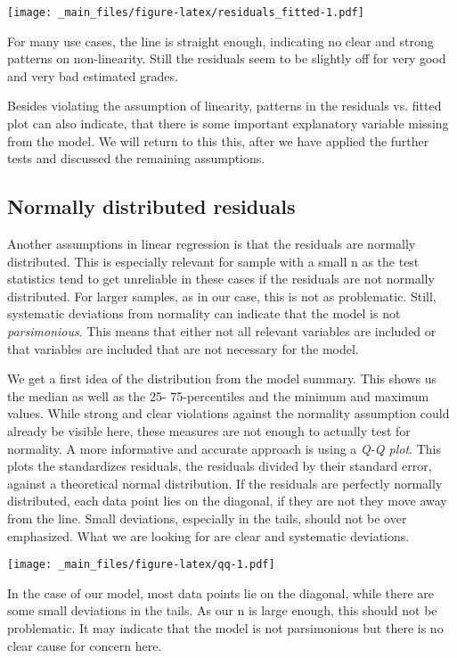 \documentclass[
]{book}
\begin{document}
\texttt{[image: \_main\_files/figure-latex/residuals\_fitted-1.pdf]}

For many use cases, the line is straight enough, indicating no clear and strong
patterns on non-linearity. Still the residuals seem to be slightly off for very
good and very bad estimated grades.

Besides violating the assumption of linearity, patterns in the residuals vs.
fitted plot can also indicate, that there is some important explanatory variable
missing from the model.
We will return to this this, after we have applied the further tests and
discussed the remaining assumptions.

\hypertarget{normally-distributed-residuals}{%
\subsection{Normally distributed residuals}\label{normally-distributed-residuals}}

Another assumptions in linear regression is that the residuals are normally
distributed. This is especially relevant for sample with a small n as the
test statistics tend to get unreliable in these cases if the residuals are not
normally distributed. For larger samples, as in our case, this is not as
problematic. Still, systematic deviations from normality can indicate that the
model is not \emph{parsimonious}. This means that either not all relevant variables
are included or that variables are included that are not necessary for the model.

We get a first idea of the distribution from the model summary. This shows us
the median as well as the 25- 75-percentiles and the minimum and maximum values.
While strong and clear violations against the normality assumption could already
be visible here, these measures are not enough to actually test for normality.
A more informative and accurate approach is using a \emph{Q-Q plot}. This plots the
standardizes residuals, the residuals divided by their standard error, against
a theoretical normal distribution. If the residuals are perfectly normally
distributed, each data point lies on the diagonal, if they are not they move
away from the line. Small deviations, especially in the tails, should not be
over emphasized. What we are looking for are clear and systematic deviations.

\texttt{[image: \_main\_files/figure-latex/qq-1.pdf]}

In the case of our model, most data points lie on the diagonal, while there are
some small deviations in the tails. As our n is large enough, this should not be
problematic. It may indicate that the model is not parsimonious but there is
no clear cause for concern here.
\end{document}
